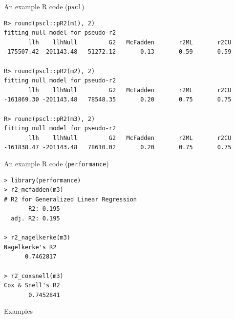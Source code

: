 \documentclass[10pt,ignorenonframetext,aspectratio=169]{beamer}
\begin{document}
\begin{frame}[fragile]{An example R code (\texttt{pscl})}
\begin{small}
\begin{verbatim}
R> round(pscl::pR2(m1), 2)
fitting null model for pseudo-r2
       llh    llhNull         G2   McFadden       r2ML       r2CU 
-175507.42 -201143.48   51272.12       0.13       0.59       0.59 

R> round(pscl::pR2(m2), 2)
fitting null model for pseudo-r2
       llh    llhNull         G2   McFadden       r2ML       r2CU 
-161869.30 -201143.48   78548.35       0.20       0.75       0.75 

R> round(pscl::pR2(m3), 2)
fitting null model for pseudo-r2
       llh    llhNull         G2   McFadden       r2ML       r2CU 
-161838.47 -201143.48   78610.02       0.20       0.75       0.75 
\end{verbatim}  
\end{small}

\end{frame}

\begin{frame}[fragile]{An example R code (\texttt{performance})}
\begin{verbatim}
> library(performance)
> r2_mcfadden(m3)
# R2 for Generalized Linear Regression
       R2: 0.195
  adj. R2: 0.195

> r2_nagelkerke(m3)
Nagelkerke's R2 
      0.7462817 

> r2_coxsnell(m3)
Cox & Snell's R2 
       0.7452841 
\end{verbatim}
\end{frame}

\begin{frame}{Examples}

\end{frame}
\end{document}
